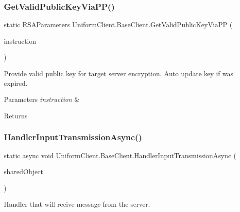 \subsubsection{\texorpdfstring{Get\+Valid\+Public\+Key\+Via\+P\+P()}{GetValidPublicKeyViaPP()}}
{\footnotesize\ttfamily static R\+S\+A\+Parameters Uniform\+Client.\+Base\+Client.\+Get\+Valid\+Public\+Key\+Via\+PP (\begin{DoxyParamCaption}\item[{\mbox{\hyperlink{class_pipes_provider_1_1_networking_1_1_routing_1_1_instruction}{Pipes\+Provider.\+Networking.\+Routing.\+Instruction}}}]{instruction }\end{DoxyParamCaption})\hspace{0.3cm}{\ttfamily [static]}}



Provide valid public key for target server encryption. Auto update key if was expired. 


\begin{DoxyParams}{Parameters}
{\em instruction} & \\
\hline
\end{DoxyParams}
\begin{DoxyReturn}{Returns}

\end{DoxyReturn}
\mbox{\label{class_uniform_client_1_1_base_client_a8b0bf0f5c032239a7b1bdc73d2d5ad3d}} 
\subsubsection{\texorpdfstring{Handler\+Input\+Transmission\+Async()}{HandlerInputTransmissionAsync()}}
{\footnotesize\ttfamily static async void Uniform\+Client.\+Base\+Client.\+Handler\+Input\+Transmission\+Async (\begin{DoxyParamCaption}\item[{object}]{shared\+Object }\end{DoxyParamCaption})\hspace{0.3cm}{\ttfamily [static]}}



Handler that will recive message from the server. 


